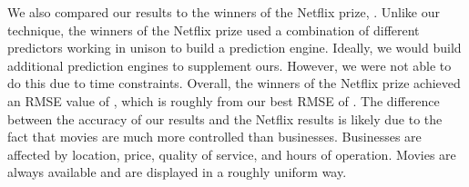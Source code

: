 We also compared our results to the winners of the Netflix prize,
\cite{netprize}. Unlike our technique, the winners of the Netflix prize used a
combination of different predictors working in unison to build a prediction
engine. Ideally, we would build additional prediction engines to supplement
ours. However, we were not able to do this due to time constraints. Overall,
the winners of the Netflix prize achieved an RMSE value of \bestNetflixRMSEnsp,
which is roughly \netDiff from our best RMSE of \bestRMSEnsp. The difference
between the accuracy of our results and the Netflix results is likely due to
the fact that movies are much more controlled than businesses. Businesses are
affected by location, price, quality of service, and hours of operation. Movies
are always available and are displayed in a roughly uniform way. 


